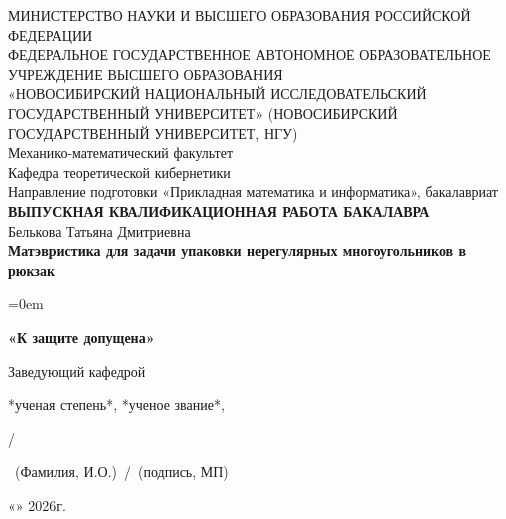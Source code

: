 \documentclass[a4paper]{article}
\begin{document}
	\begin{singlespacing} %
		\thispagestyle{empty} %
		\begin{center}
			\small{МИНИСТЕРСТВО НАУКИ И ВЫСШЕГО ОБРАЗОВАНИЯ РОССИЙСКОЙ ФЕДЕРАЦИИ}\\
			\bigskip
			\small{ФЕДЕРАЛЬНОЕ ГОСУДАРСТВЕННОЕ АВТОНОМНОЕ ОБРАЗОВАТЕЛЬНОЕ УЧРЕЖДЕНИЕ ВЫСШЕГО ОБРАЗОВАНИЯ}\\
			\medskip
			\small{«НОВОСИБИРСКИЙ НАЦИОНАЛЬНЫЙ ИССЛЕДОВАТЕЛЬСКИЙ ГОСУДАРСТВЕННЫЙ УНИВЕРСИТЕТ» (НОВОСИБИРСКИЙ ГОСУДАРСТВЕННЫЙ УНИВЕРСИТЕТ, НГУ)}\\ 
			\hfill \break
			\small{Механико-математический факультет}\\
			\medskip
			\small{Кафедра теоретической кибернетики}\\
			\smallskip
			\bigskip
			\small{Направление подготовки «Прикладная математика и информатика», бакалавриат}\\
			\vspace{2.5cm}
			\small{\textbf{ВЫПУСКНАЯ КВАЛИФИКАЦИОННАЯ РАБОТА БАКАЛАВРА}}\\
			\medskip
			\hfill \break
			\small{Белькова Татьяна Дмитриевна}\\
			\hfill \break
			\normalsize{\textbf{Матэвристика для задачи упаковки нерегулярных многоугольников в рюкзак}}\\
		\end{center}
	\end{singlespacing}
	\vspace{2.5cm}
	\noindent
	\begin{minipage}{70mm}\parindent=0em
	\begin{flushleft}
			\small{\textbf{«К защите допущена»}\par
			\medskip
			Заведующий кафедрой\par
			\medskip
			*ученая степень*, *ученое звание*,\par
			\medskip		
			\small{\;\;}%
			/ \makebox[2cm]{\dotfill}\par}
		\scriptsize{~(Фамилия, И.О.)~/~(подпись, МП)}\par
		\smallskip
		\small{«\makebox[1cm]{\dotfill}»\makebox[3cm]{\dotfill} 2026г.}
	\end{flushleft}
	\end{minipage}
	\hspace{3cm}
\end{document}
